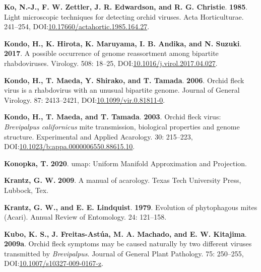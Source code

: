 \documentclass[12pt,final,CPage]{ufthesis}
\newlength{\cslhangindent}
\newenvironment{CSLReferences}[2] %
{%
	\setlength{\parindent}{0pt}
	\ifodd #1 \everypar{\setlength{\hangindent}{\cslhangindent}}\ignorespaces\fi
	\ifnum #2 > 0
	\setlength{\parskip}{#2\baselineskip}
	\fi
}%
{}
\begin{document}
{\begin{CSLReferences}{1}{0}
  \leavevmode{}%
  \textbf{Ko, N.-J., F. W. Zettler, J. R. Edwardson, and R. G. Christie}. \textbf{1985}. Light microscopic techniques for detecting orchid viruses. Acta Horticulturae. 241--254, DOI:\href{https://doi.org/10.17660/actahortic.1985.164.27}{10.17660/actahortic.1985.164.27}.

  \leavevmode{}%
  \textbf{Kondo, H., K. Hirota, K. Maruyama, I. B. Andika, and N. Suzuki}. \textbf{2017}. A possible occurrence of genome reassortment among bipartite rhabdoviruses. Virology. 508: 18--25, DOI:\href{https://doi.org/10.1016/j.virol.2017.04.027}{10.1016/j.virol.2017.04.027}.

  \leavevmode{}%
  \textbf{Kondo, H., T. Maeda, Y. Shirako, and T. Tamada}. \textbf{2006}. {Orchid fleck virus} is a rhabdovirus with an unusual bipartite genome. Journal of General Virology. 87: 2413--2421, DOI:\href{https://doi.org/10.1099/vir.0.81811-0}{10.1099/vir.0.81811-0}.

  \leavevmode{}%
  \textbf{Kondo, H., T. Maeda, and T. Tamada}. \textbf{2003}. {Orchid fleck virus}: {\emph{Brevipalpus californicus}} mite transmission, biological properties and genome structure. Experimental and Applied Acarology. 30: 215--223, DOI:\href{https://doi.org/10.1023/b:appa.0000006550.88615.10}{10.1023/b:appa.0000006550.88615.10}.

  \leavevmode{}%
  \textbf{Konopka, T.} \textbf{2020}. {umap}: {Uniform} {Manifold} {Approximation} and {Projection}.

  \leavevmode{}%
  \textbf{Krantz, G. W.} \textbf{2009}. A manual of acarology. Texas Tech University Press, Lubbock, Tex.

  \leavevmode{}%
  \textbf{Krantz, G. W., and E. E. Lindquist}. \textbf{1979}. Evolution of phytophagous mites ({Acari}). Annual Review of Entomology. 24: 121--158.

  \leavevmode{}%
  \textbf{Kubo, K. S., J. Freitas-Astúa, M. A. Machado, and E. W. Kitajima}. \textbf{2009a}. {Orchid fleck} symptoms may be caused naturally by two different viruses transmitted by {\emph{Brevipalpus}}. Journal of General Plant Pathology. 75: 250--255, DOI:\href{https://doi.org/10.1007/s10327-009-0167-z}{10.1007/s10327-009-0167-z}.


\end{CSLReferences}}
\end{document}
